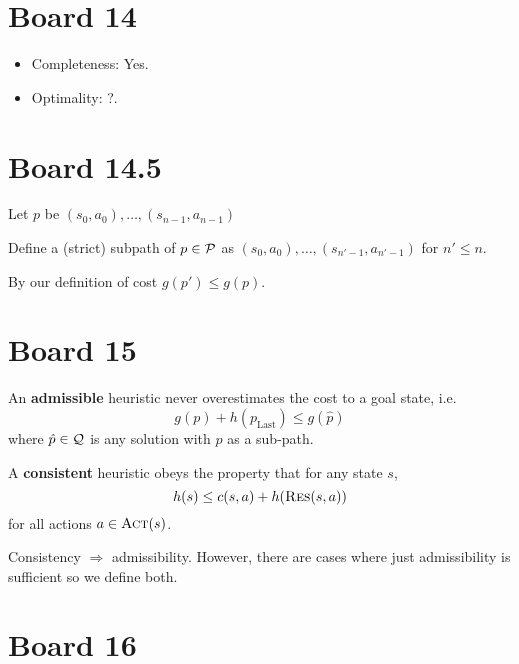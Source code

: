 \documentclass[10pt]{article}
\begin{document}
\section{Board 14} 

\begin{itemize}
\item Completeness: Yes.  
\item Optimality: ?. 
\end{itemize}

\section{Board 14.5}
Let $p$ be $(s_0, a_0), \ldots, (s_{n-1}, a_{n-1})$
  
Define a (strict) subpath of $p \in \mathcal{P}$ as $(s_0, a_0), \ldots, (s_{n'-1}, a_{n'-1})$
for $n' \leq n$.

By our definition of cost $g(p') \leq g(p)$.


\section{Board 15}

\begin{defn}
  An \textbf{admissible} heuristic never overestimates the cost to a goal state, i.e.  \[g(p) +
  h(p_{\mathrm{Last}}) \leq g(\hat{p})\] where $\hat{p}\in \mathcal{Q}$ is any solution with 
  $p$ as a sub-path.
\end{defn}

\begin{defn}
  A  \textbf{consistent} heuristic obeys the property that for any state $s$, \[h(s) \leq c(s, a)
  + h(\mathrm{\textsc{Res}}(s, a))\]
 for all
  actions $a \in \mathrm{\textsc{Act}}(s)$.
\end{defn}

Consistency $\Rightarrow$ admissibility. However, there are cases where just admissibility is sufficient so we define both.



\section{Board 16}
\end{document}

